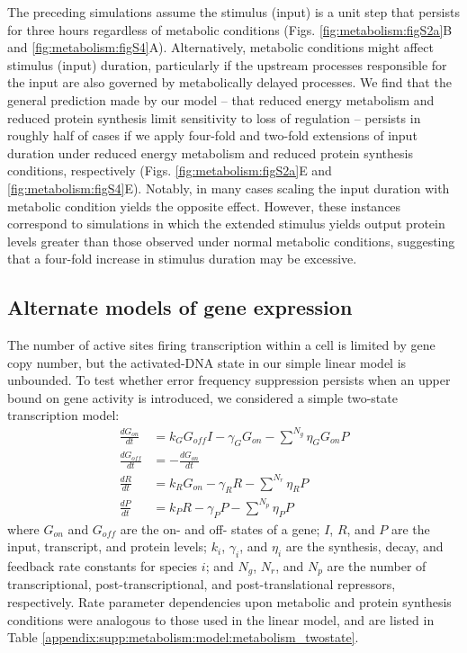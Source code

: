 The preceding simulations assume the stimulus (input) is a unit step that persists for three hours regardless of metabolic conditions (Figs. \ref{fig:metabolism:figS2a}B and \ref{fig:metabolism:figS4}A). Alternatively, metabolic conditions might affect stimulus (input) duration, particularly if the upstream processes responsible for the input are also governed by metabolically delayed processes. We find that the general prediction made by our model -- that reduced energy metabolism and reduced protein synthesis limit sensitivity to loss of regulation -- persists in roughly half of cases if we apply four-fold and two-fold extensions of input duration under reduced energy metabolism and reduced protein synthesis conditions, respectively (Figs. \ref{fig:metabolism:figS2a}E and \ref{fig:metabolism:figS4}E). Notably, in many cases scaling the input duration with metabolic condition yields the opposite effect. However, these instances correspond to simulations in which the extended stimulus yields output protein levels greater than those observed under normal metabolic conditions, suggesting that a four-fold increase in stimulus duration may be excessive.

\subsection{Alternate models of gene expression}
\label{appendix:supp:metabolism:model:alt_models}

The number of active sites firing transcription within a cell is limited by gene copy number, but the activated-DNA state in our simple linear model is unbounded. To test whether error frequency suppression persists when an upper bound on gene activity is introduced, we considered a simple two-state transcription model:
\begin{equation}
\begin{aligned}
\label{appendix:supp:metabolism:model:twostate_eqns}
\frac{dG_{on}}{dt} &= k_{G}G_{off}I -\gamma_G G_{on} - \sum^{N_g}{\eta_{G} G_{on}P} \\
\frac{dG_{off}}{dt} &= -\frac{dG_{on}}{dt} \\
\frac{dR}{dt} &= k_{R} G_{on} -\gamma_R R -\sum^{N_r}{\eta_{R} P} \\
\frac{dP}{dt} &= k_{P} R -\gamma_P P -\sum^{N_p}{\eta_{P} P}
\end{aligned}
\end{equation}
where $G_{on}$ and $G_{off}$ are the on- and off- states of a gene; $I$, $R$, and $P$ are the input, transcript, and protein levels; $k_i$, $\gamma_i$, and $\eta_i$ are the synthesis, decay, and feedback rate constants for species $i$; and $N_g$, $N_r$, and $N_p$ are the number of transcriptional, post-transcriptional, and post-translational repressors, respectively. Rate parameter dependencies upon metabolic and protein synthesis conditions were analogous to those used in the linear model, and are listed in Table \ref{appendix:supp:metabolism:model:metabolism_twostate}.

